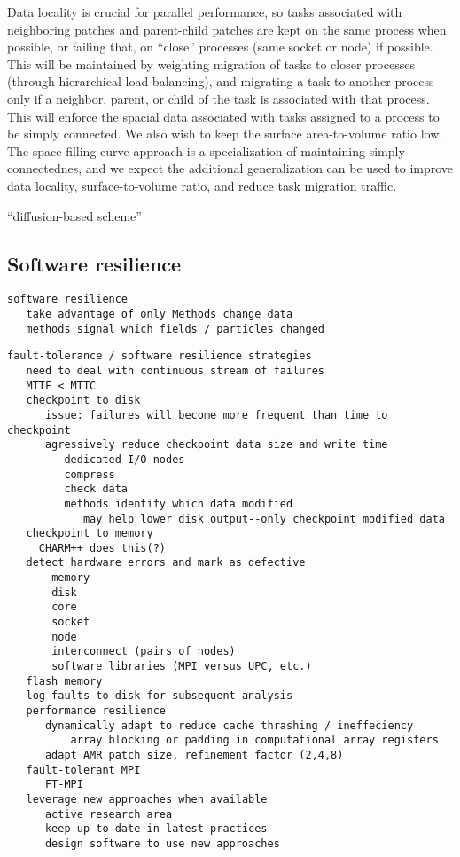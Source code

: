 \documentclass[14pt,letter]{article}
\begin{document}
%
Data locality is crucial for parallel performance, so tasks associated
with neighboring patches and parent-child patches are kept on the same
process when possible, or failing that, on ``close'' processes (same
socket or node) if possible.  This will be maintained by weighting
migration of tasks to closer processes (through hierarchical load
balancing), and migrating a task to another process only if a
neighbor, parent, or child of the task is associated with that
process.  This will enforce the spacial data associated with tasks
assigned to a process to be simply connected.  We also wish to keep
the surface area-to-volume ratio low.  The space-filling curve
approach is a specialization of maintaining simply connectednes, and
we expect the additional generalization can be used to improve data
locality, surface-to-volume ratio, and reduce task migration traffic.

``diffusion-based scheme''

\subsection{Software resilience} \label{ss:resilience}

\begin{verbatim}
software resilience
   take advantage of only Methods change data
   methods signal which fields / particles changed
\end{verbatim}
\begin{verbatim}
fault-tolerance / software resilience strategies
   need to deal with continuous stream of failures
   MTTF < MTTC
   checkpoint to disk
      issue: failures will become more frequent than time to checkpoint
      agressively reduce checkpoint data size and write time
         dedicated I/O nodes
         compress
         check data
         methods identify which data modified
            may help lower disk output--only checkpoint modified data
   checkpoint to memory
     CHARM++ does this(?)
   detect hardware errors and mark as defective
       memory
       disk
       core
       socket
       node
       interconnect (pairs of nodes)
       software libraries (MPI versus UPC, etc.)
   flash memory
   log faults to disk for subsequent analysis
   performance resilience
      dynamically adapt to reduce cache thrashing / ineffeciency
          array blocking or padding in computational array registers
      adapt AMR patch size, refinement factor (2,4,8)
   fault-tolerant MPI
      FT-MPI
   leverage new approaches when available
      active research area
      keep up to date in latest practices
      design software to use new approaches
\end{verbatim}
\end{document}
